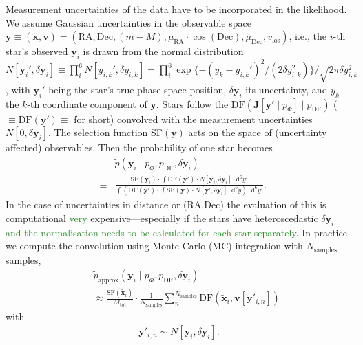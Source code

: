 \documentclass[iop,revtex4,numberedappendix,appendixfloats]{emulateapj}
\newcommand{\vect}[1]{\boldsymbol{#1}}
\newcommand*\Diff[1]{\mathop{}\!\mathrm{d^#1}}
\newcommand{\NEW}[1]{\textcolor{ForestGreen}{#1}}
\begin{document}
Measurement uncertainties of the data have to be incorporated in the likelihood. We assume Gaussian uncertainties in the observable space $\vect{y} \equiv (\tilde{\vect{x}},\tilde{\vect{v}})=(\text{RA},\text{Dec},(m-M),\mu_\text{RA} \cdot \cos (\text{Dec}),\mu_\text{Dec},v_\text{los})$, i.e., the $i$-th star's observed $\vect{y}_i$ is drawn from the normal distribution $N[{\vect{y}_i}',\delta \vect{y}_i] \equiv \prod_i^6 N[{y_{i,k}}',\delta y_{i,k}] =  \prod_i^6 \exp \{-(y_{k}-{y_{i,k}}')^2/ (2 \delta y_{i,k}^2) \} / \sqrt{2 \pi \delta y_{i,k}^2}$, with ${\vect{y}_i}'$ being the star's true phase-space position, $\delta \vect{y}_i$ its uncertainty, and $y_k$ the $k$-th coordinate component of $\vect{y}$. Stars follow the $\text{DF}(\vect{J}[\vect{y}' \mid p_\Phi] \mid p_\text{DF})$ ($\equiv \text{DF}(\vect{y}') \equiv$  for short) convolved with the measurement uncertainties $N[0,\delta \vect{y}_i]$. The selection function SF$(\vect{y})$ acts on the space of (uncertainty affected) observables. Then the probability of one star becomes
\begin{eqnarray}
&&\tilde{p}(\vect{y}_i \mid p_\Phi,p_\text{DF},\delta \vect{y}_i)\nonumber\\
& \equiv& \frac{\text{SF}(\vect{y}_i) \cdot \int \text{DF}(\vect{y}') \cdot N[\vect{y}_i,\delta \vect{y}_i] \Diff{6} y'}{\int \left(  \text{DF}(\vect{y}')  \cdot  \int \text{SF}(\vect{y})  \cdot N[\vect{y}',\delta \vect{y}_i] \Diff{6} y \right) \Diff{6}y'}.
\end{eqnarray}
In the case of uncertainties in distance or (RA,Dec) the evaluation of this is computational \NEW{very} expensive---especially if the stars have heteroscedastic $\delta \vect{y}_i$\NEW{ and the normalisation needs to be calculated for each star separately}. In practice we compute the convolution using Monte Carlo (MC) integration with $N_\text{samples}$ samples,
\begin{eqnarray}
&&\tilde{p}_\text{approx}(\vect{y}_i \mid p_\Phi,p_\text{DF},\delta \vect{y}_i) \nonumber\\
&&\approx \frac{ \text{SF}(\tilde{\vect{x}}_i)}{M_\text{tot}} \cdot \frac{1}{N_\text{samples}} \sum_n^{N_\text{samples}}  \text{DF}(\tilde{\vect{x}}_i,\vect{v}[\vect{y}'_{i,n}]) \label{eq:errorconv}
\end{eqnarray}
with
\begin{eqnarray}
\vect{y}'_{i,n} \sim N[\vect{y}_i,\delta \vect{y}_i].\nonumber
\end{eqnarray}
\end{document}
